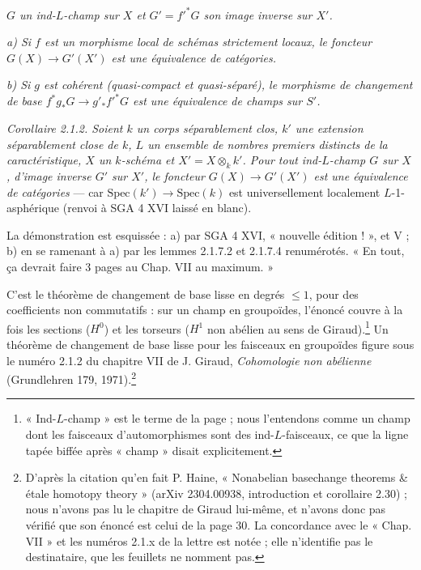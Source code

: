 \documentclass[11pt,a4paper]{article}
\begin{document}

\emph{$G$ un ind-$L$-champ sur $X$ et $G' = f'^{*}G$ son image inverse sur
$X'$.}

\emph{a) Si $f$ est un morphisme local de schémas strictement locaux, le
foncteur $G(X) \to G'(X')$ est une équivalence de catégories.}

\emph{b) Si $g$ est cohérent (quasi-compact et quasi-séparé), le morphisme de
changement de base $f^{*}g_{*}G \to g'_{*}f'^{*}G$ est une équivalence de
champs sur $S'$.}

\emph{Corollaire 2.1.2. Soient $k$ un corps séparablement clos, $k'$ une
extension séparablement close de $k$, $L$ un ensemble de nombres premiers
distincts de la caractéristique, $X$ un $k$-schéma et $X' = X \otimes_k k'$.
Pour tout ind-$L$-champ $G$ sur $X$, d'image inverse $G'$ sur $X'$, le
foncteur $G(X) \to G'(X')$ est une équivalence de catégories} --- car
$\mathrm{Spec}(k') \to \mathrm{Spec}(k)$ est universellement localement
$L$-1-asphérique (renvoi à SGA 4 XVI laissé en blanc).

La démonstration est esquissée : a) par SGA 4 XVI, « nouvelle édition ! », et
V ; b) en se ramenant à a) par les lemmes 2.1.7.2 et 2.1.7.4 renumérotés.
« En tout, ça devrait faire 3 pages au Chap. VII au maximum. »

C'est le théorème de changement de base lisse en degrés $\le 1$, pour des
coefficients non commutatifs : sur un champ en groupoïdes, l'énoncé couvre à
la fois les sections ($H^0$) et les torseurs ($H^1$ non abélien au sens de
Giraud).\footnote{« Ind-$L$-champ » est le terme de la page ; nous l'entendons
comme un champ dont les faisceaux d'automorphismes sont des
ind-$L$-faisceaux, ce que la ligne tapée biffée après « champ » disait
explicitement.} Un théorème de changement de base lisse pour les faisceaux
en groupoïdes figure sous le numéro 2.1.2 du chapitre VII de J. Giraud,
\emph{Cohomologie non abélienne} (Grundlehren 179, 1971).\footnote{D'après la
citation qu'en fait P. Haine, « Nonabelian basechange theorems \& étale
homotopy theory » (arXiv 2304.00938, introduction et corollaire 2.30) ; nous
n'avons pas lu le chapitre de Giraud lui-même, et n'avons donc pas vérifié que
son énoncé est celui de la page 30. La concordance avec le « Chap. VII » et
les numéros 2.1.x de la lettre est notée ; elle n'identifie pas le
destinataire, que les feuillets ne nomment pas.}
\end{document}
